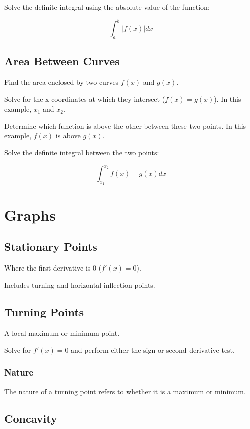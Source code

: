 \documentclass[a4paper,11pt]{article}
\begin{document}
Solve the definite integral using the absolute value of the function:

$$
\int_a^b \lvert f(x) \rvert dx
$$


\subsection{Area Between Curves}

Find the area enclosed by two curves $f(x)$ and $g(x)$.

Solve for the x coordinates at which they intersect ($f(x) = g(x)$). In this
example, $x_1$ and $x_2$.

Determine which function is above the other between these two points. In this
example, $f(x)$ is above $g(x)$.

Solve the definite integral between the two points:

$$
\int_{x_1}^{x_2} f(x) - g(x) dx
$$




\section{Graphs}

\subsection{Stationary Points}

Where the first derivative is 0 ($f'(x) = 0$).

Includes turning and horizontal inflection points.


\subsection{Turning Points}

A local maximum or minimum point.

Solve for $f'(x) = 0$ and perform either the sign or second derivative test.


\subsubsection{Nature}

The nature of a turning point refers to whether it is a maximum or minimum.


\subsection{Concavity}
\end{document}
